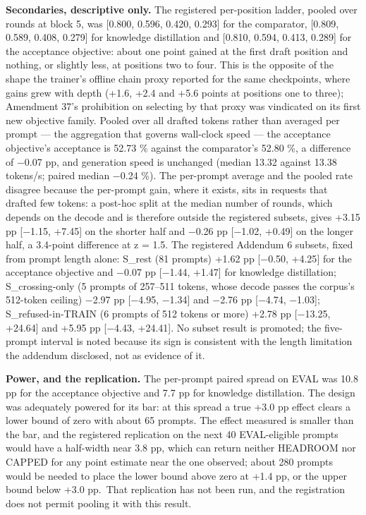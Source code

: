 \documentclass[
  11pt,
]{article}
\begin{document}
\textbf{Secondaries, descriptive only.} The registered per-position
ladder, pooled over rounds at block 5, was {[}0.800, 0.596, 0.420,
0.293{]} for the comparator, {[}0.809, 0.589, 0.408, 0.279{]} for
knowledge distillation and {[}0.810, 0.594, 0.413, 0.289{]} for the
acceptance objective: about one point gained at the first draft position
and nothing, or slightly less, at positions two to four. This is the
opposite of the shape the trainer's offline chain proxy reported for the
same checkpoints, where gains grew with depth (+1.6, +2.4 and +5.6
points at positions one to three); Amendment 37's prohibition on
selecting by that proxy was vindicated on its first new objective
family. Pooled over all drafted tokens rather than averaged per prompt
--- the aggregation that governs wall-clock speed --- the acceptance
objective's acceptance is 52.73 \% against the comparator's 52.80 \%, a
difference of −0.07 pp, and generation speed is unchanged (median 13.32
against 13.38 tokens/s; paired median −0.24 \%). The per-prompt average
and the pooled rate disagree because the per-prompt gain, where it
exists, sits in requests that drafted few tokens: a post-hoc split at
the median number of rounds, which depends on the decode and is
therefore outside the registered subsets, gives +3.15 pp {[}−1.15,
+7.45{]} on the shorter half and −0.26 pp {[}−1.02, +0.49{]} on the
longer half, a 3.4-point difference at z = 1.5. The registered Addendum
6 subsets, fixed from prompt length alone: S\_rest (81 prompts) +1.62 pp
{[}−0.50, +4.25{]} for the acceptance objective and −0.07 pp {[}−1.44,
+1.47{]} for knowledge distillation; S\_crossing-only (5 prompts of
257--511 tokens, whose decode passes the corpus's 512-token ceiling)
−2.97 pp {[}−4.95, −1.34{]} and −2.76 pp {[}−4.74, −1.03{]};
S\_refused-in-TRAIN (6 prompts of 512 tokens or more) +2.78 pp
{[}−13.25, +24.64{]} and +5.95 pp {[}−4.43, +24.41{]}. No subset result
is promoted; the five-prompt interval is noted because its sign is
consistent with the length limitation the addendum disclosed, not as
evidence of it.

\textbf{Power, and the replication.} The per-prompt paired spread on
EVAL was 10.8 pp for the acceptance objective and 7.7 pp for knowledge
distillation. The design was adequately powered for its bar: at this
spread a true +3.0 pp effect clears a lower bound of zero with about 65
prompts. The effect measured is smaller than the bar, and the registered
replication on the next 40 EVAL-eligible prompts would have a half-width
near 3.8 pp, which can return neither HEADROOM nor CAPPED for any point
estimate near the one observed; about 280 prompts would be needed to
place the lower bound above zero at +1.4 pp, or the upper bound below
+3.0 pp.~That replication has not been run, and the registration does
not permit pooling it with this result.
\end{document}
